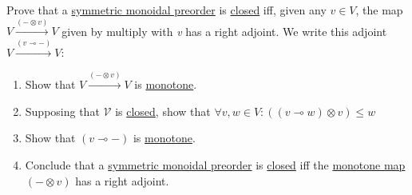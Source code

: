Prove that a \hyperref[D2.2]{symmetric monoidal preorder} is \hyperref[D2.79]{closed} iff, given any $v \in V$, the map $V \xrightarrow{(-\otimes v)}V$ given by multiply with \emph{v} has a right adjoint.  We write this adjoint $V \xrightarrow{(v \multimap -)}V$:
\begin{enumerate}
  \item Show that $V \xrightarrow{(-\otimes v)}V$ is \hyperref[D1.59]{monotone}.
  \item Supposing that $\mathcal{V}$ is \hyperref[D2.79]{closed}, show that $\forall v,w \in V: ((v \multimap w)\otimes v) \leq w$
  \item Show that $(v \multimap -)$ is \hyperref[D1.59]{monotone}.
  \item Conclude that a \hyperref[D2.2]{symmetric monoidal preorder} is \hyperref[D2.79]{closed} iff the \hyperref[D1.59]{monotone map} $(- \otimes v)$ has a right adjoint.
\end{enumerate}